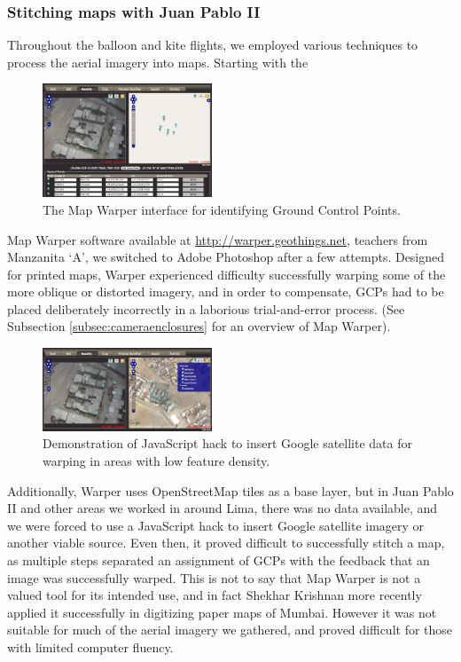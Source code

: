 \documentclass[11pt]{report}
\begin{document}
\subsubsection{Stitching maps with Juan Pablo II}
\label{subsec:stitchingjp2}

Throughout the balloon and kite flights, we employed various techniques to process the aerial imagery into maps. Starting with the \begin{figure}
	\begin{flushright}
		\includegraphics[width=0.45\textwidth]{images/map-warper.png}
		\caption{The Map Warper interface for identifying Ground Control Points. \cite{waters2009warper}}
	\end{flushright}
\end{figure} Map Warper software available at \url{http://warper.geothings.net}, teachers from Manzanita `A', we switched to Adobe Photoshop after a few attempts. Designed for printed maps, Warper experienced difficulty successfully warping some of the more oblique or distorted imagery, and in order to compensate, GCPs had to be placed deliberately incorrectly in a laborious trial-and-error process. (See Subsection \ref{subsec:cameraenclosures} for an overview of Map Warper). \begin{figure}
	\begin{flushright}
		\includegraphics[width=0.45\textwidth]{images/map-warper-hack.png}
		\caption{Demonstration of JavaScript hack to insert Google satellite data for warping in areas with low feature density. \cite{waters2009warper}}
	\end{flushright}
\end{figure}Additionally, Warper uses OpenStreetMap tiles as a base layer, but in Juan Pablo II and other areas we worked in around Lima, there was no data available, and we were forced to use a JavaScript hack to insert Google satellite imagery or another viable source. Even then, it proved difficult to successfully stitch a map, as multiple steps separated an assignment of GCPs with the feedback that an image was successfully warped. This is not to say that Map Warper is not a valued tool for its intended use, and in fact Shekhar Krishnan more recently applied it successfully in digitizing paper maps of Mumbai. However it was not suitable for much of the aerial imagery we gathered, and proved difficult for those with limited computer fluency.
\end{document}
